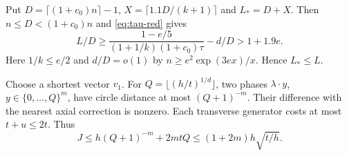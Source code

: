 Put $D=\lceil(1+c_0)n\rceil-1$, $X=\lceil1.1D/(k+1)\rceil$ and $L_*=D+X$.
Then $n\le D<(1+c_0)n$ and \eqref{eq:tau-red} gives
\begin{equation}\label{eq:box-margin}
 L/D\ge\frac{1-e/5}{(1+1/k)(1+c_0)\tau}-d/D>1+1.9e .
\end{equation}
Here $1/k\le e/2$ and $d/D=o(1)$ by $n\ge e^2\exp(3ex)/x$.
Hence $L_*\le L$.

Choose a shortest vector $v_1$. For $Q=\lfloor(h/t)^{1/d}\rfloor$, two phases
$\lambda\cdot y$, $y\in\{0,\ldots,Q\}^m$, have circle distance at most $(Q+1)^{-m}$.
Their difference with the nearest axial correction is nonzero.
Each transverse generator costs at most $t+u\le2t$. Thus
\begin{equation}\label{eq:short-upper}
 J\le h(Q+1)^{-m}+2mtQ\le(1+2m)h\sqrt{t/h}.
\end{equation}

